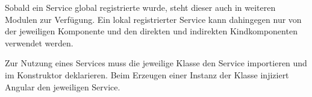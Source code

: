 Sobald ein Service global registrierte wurde, steht dieser auch in weiteren Modulen zur Verfügung. Ein lokal registrierter Service kann dahingegen nur von der jeweiligen Komponente und den direkten und indirekten Kindkomponenten verwendet werden. 

Zur Nutzung eines Services muss die jeweilige Klasse den Service importieren und im Konstruktor deklarieren. Beim Erzeugen einer Instanz der Klasse injiziert Angular den jeweiligen Service.\autocites[vgl.][92\psqq]{Steyer.2017}[vgl.][474\psqq]{Freeman.2018}    